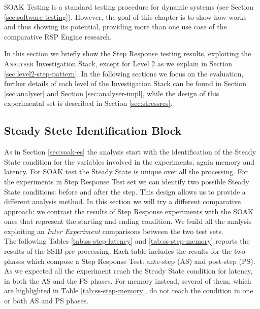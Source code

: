 SOAK Testing is a standard testing procedure for dynamic systems (see Section \ref{sec:software-testing}). However, the goal of this chapter is to show how \name works and thus showing its potential, providing more than one use case of the comparative RSP Engine research.

In this section we briefly show the Step Response testing results, exploiting the \textsc{Analyser} Investigation Stack, except for Level 2 as we explain in Section \ref{sec:level2-step-pattern}. In the following sections we focus on the evaluation, further details of each level of the Investigation Stack can be found in Section \ref{sec:analyser} and Section \ref{sec:analyser-impl}, while the design of this experimental set is described in Section \ref{sec:stressres}.



\subsection{Steady Stete Identification Block}\label{sec:level0-step-ssib}

As in Section \ref{sec:soak-es} the analysis start with the identification of the Steady State condition for the variables involved in the experiments, again memory and latency. For SOAK test the Steady State is unique over all the processing. For the experiments in Step Response Test set we can identify two possible Steady State conditions: before and after the step. This design allows us to provide a different analysis method. In this section we will try a different comparative approach: we contrast the results of Step Response experiments with the SOAK ones that represent the starting and ending condition. We build all the analysis exploiting an  \textit{Inter Experiment} comparisons between the two test sets.\\

The following Tables \ref{tab:ss-step-latency} and \ref{tab:ss-step-memory} reports the results of the SSIB pre-processing. Each table includes the results for the two phases which compose a Step Response Test: ante-step (AS) and post-step (PS). As we expected all the experiment reach the Steady State condition for latency, in both the AS and the PS phases. For memory instead, several of them, which are highlighted in Table \ref{tab:ss-step-memory}, do not reach the condition in one or both AS and PS phases.

